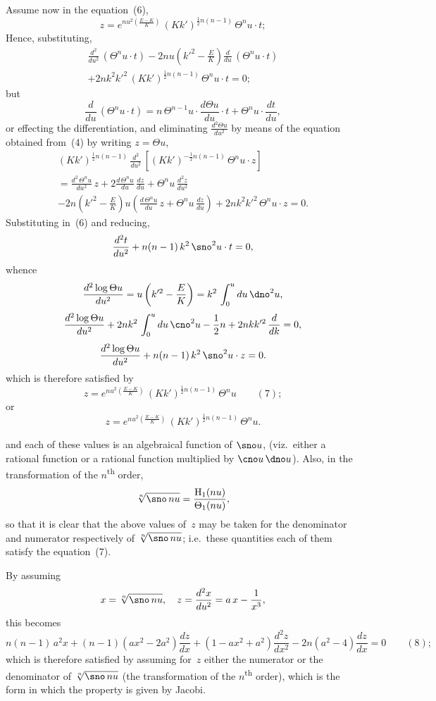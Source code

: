 \documentclass[11pt,a4paper]{book}
\begin{document}
\newpage
Assume now in the equation~(6),
\[
z = e^{nu^2\left(\frac{E-K}{K}\right)} \, (Kk')^{\frac{1}{2}n(n-1)} \, \Theta^n u \cdot t;
\]
Hence, substituting,
\begin{multline*}
\frac{d^2}{du^2}\,(\Theta^n u \cdot t) - 2nu\left(k'^2 - \frac{E}{K}\right)\frac{d}{du}\,(\Theta^n u \cdot t) \\
+ 2nk^2k'^2\,(Kk')^{\frac{1}{2}n(n-1)}\,\Theta^n u \cdot t = 0;
\end{multline*}
but
\[
\frac{d}{du}\,(\Theta^n u \cdot t) = n\,\Theta^{n-1} u \cdot \frac{d\Theta u}{du} \cdot t + \Theta^n u \cdot \frac{dt}{du},
\]
or effecting the differentiation, and eliminating $\frac{d^2\Theta u}{du^2}$ by means of the equation obtained from~(4) by writing $z = \Theta u$,
\begin{multline*}
(Kk')^{\frac{1}{2}n(n-1)} \, \frac{d^2}{du^2}\,[(Kk')^{-\frac{1}{2}n(n-1)}\,\Theta^n u \cdot z] \\
= \frac{d^2\,\Theta^n u}{du^2}\,z + 2\frac{d\,\Theta^n u}{du}\,\frac{dz}{du} + \Theta^n u\,\frac{d^2z}{du^2} \\
- 2n\left(k'^2 - \frac{E}{K}\right)u\left(\frac{d\,\Theta^n u}{du}\,z + \Theta^n u\,\frac{dz}{du}\right) + 2nk^2k'^2\,\Theta^n u \cdot z = 0.
\end{multline*}
Substituting in~(6) and reducing,
\[
\frac{d^2t}{du^2} + n(n-1)\,k^2\,\sno^2 u \cdot t = 0,
\]
whence
\[
\frac{d^2\log\Theta u}{du^2} = u\left(k'^2 - \frac{E}{K}\right) = k^2\,\int_0^u du\,\dno^2 u,
\]
\[
\frac{d^2\log\Theta u}{du^2} + 2nk^2\,\int_0^u du\,\cno^2 u - \frac{1}{2}n + 2nk k'^2\,\frac{d}{dk} = 0,
\]
\[
\frac{d^2\log\Theta u}{du^2} + n(n-1)\,k^2\,\sno^2 u \cdot z = 0.
\]
which is therefore satisfied by
\[
z = e^{nu^2\left(\frac{E-K}{K}\right)} \, (Kk')^{\frac{1}{2}n(n-1)} \, \Theta^n u \qquad(7);
\]
or
\[
z = e^{nu^2\left(\frac{E-K}{K}\right)} \, (Kk')^{\frac{1}{2}n(n-1)} \, \Theta^n u.
\]

\newpage
and each of these values is an algebraical function of $\sno u$, (viz.\ either a rational function or a rational function multiplied by $\cno u\,\dno u$). Also, in the transformation of the $n$\textsuperscript{th} order,
\[
\sqrt[n]{\sno\,nu} = \frac{\mathrm{H}_1(nu)}{\Theta_1(nu)},
\]
so that it is clear that the above values of~$z$ may be taken for the denominator and numerator respectively of $\sqrt[n]{\sno\,nu}$; i.e.\ these quantities each of them satisfy the equation~(7).

By assuming
\[
x = \sqrt[n]{\sno\,nu}, \quad z = \frac{d^2x}{du^2} = a\,x - \frac{1}{x^3},
\]
this becomes
\[
n(n-1)\,a^2x + (n-1)(ax^2 - 2a^2)\frac{dz}{dx} + (1-ax^2+a^2)\frac{d^2z}{dx^2} - 2n(a^2-4)\frac{dz}{dx} = 0 \qquad(8);
\]
which is therefore satisfied by assuming for~$z$ either the numerator or the denominator of $\sqrt[n]{\sno\,nu}$ (the transformation of the $n$\textsuperscript{th} order), which is the form in which the property is given by Jacobi.
\end{document}
